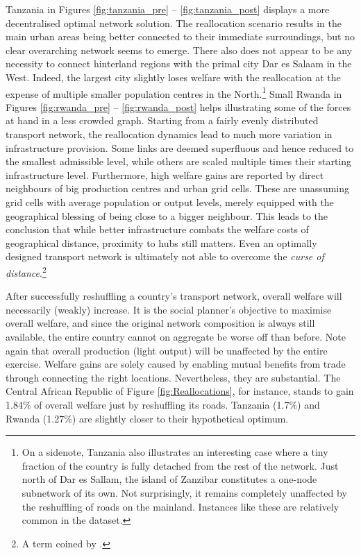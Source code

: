 \documentclass[11pt, oneside]{article}   	%
\begin{document}
Tanzania in Figures \eqref{fig:tanzania_pre} -- \eqref{fig:tanzania_post} displays a more decentralised optimal network solution. The reallocation scenario results in the main urban areas being better connected to their immediate surroundings, but no clear overarching network seems to emerge. There also does not appear to be any necessity to connect hinterland regions with the primal city Dar es Salaam in the West. Indeed, the largest city slightly loses welfare with the reallocation at the expense of multiple smaller population centres in the North.\footnote{On a sidenote, Tanzania also illustrates an interesting case where a tiny fraction of the country is fully detached from the rest of the network. Just north of Dar es Sallam, the island of Zanzibar constitutes a one-node subnetwork of its own. Not surprisingly, it remains completely unaffected by the reshuffling of roads on the mainland. Instances like these are relatively common in the dataset.} Small Rwanda in Figures \eqref{fig:rwanda_pre} -- \eqref{fig:rwanda_post} helps illustrating some of the forces at hand in a less crowded graph. Starting from a fairly evenly distributed transport network, the reallocation dynamics lead to much more variation in infrastructure provision. Some links are deemed superfluous and hence reduced to the smallest admissible level, while others are scaled multiple times their starting infrastructure level. Furthermore, high welfare gains are reported by direct neighbours of big production centres and urban grid cells. These are unassuming grid cells with average population or output levels, merely equipped with the geographical blessing of being close to a bigger neighbour. This leads to the conclusion that while better infrastructure combats the welfare costs of geographical distance, proximity to hubs still matters. Even an optimally designed transport network is ultimately not able to overcome the \emph{curse of distance}.\footnote{A term coined by \cite{Boulhol_Havedevelopedcountries_2010}.}

After successfully reshuffling a country's transport network, overall welfare will necessarily (weakly) increase. It is the social planner's objective to maximise overall welfare, and since the original network composition is always still available, the entire country cannot on aggregate be worse off than before. Note again that overall production (light output) will be unaffected by the entire exercise. Welfare gains are solely caused by enabling mutual benefits from trade through connecting the right locations. Nevertheless, they are substantial. The Central African Republic of Figure \eqref{fig:Reallocations}, for instance, stands to gain 1.84\% of overall welfare just by reshuffling its roads. Tanzania (1.7\%) and Rwanda (1.27\%) are slightly closer to their hypothetical optimum.
\end{document}
